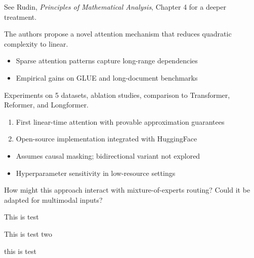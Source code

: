 \documentclass{report}
\begin{document}
\begin{optionalExplore}
	See Rudin, \textit{Principles of Mathematical Analysis}, Chapter 4 for a deeper treatment.
\end{optionalExplore}

\begin{coreIdea}
	The authors propose a novel attention mechanism that reduces quadratic complexity to linear.
\end{coreIdea}

\begin{keyArgs}
	\begin{itemize}
		\item Sparse attention patterns capture long-range dependencies
		\item Empirical gains on GLUE and long-document benchmarks
	\end{itemize}
\end{keyArgs}

\begin{methodology}
	Experiments on 5 datasets, ablation studies, comparison to Transformer, Reformer, and Longformer.
\end{methodology}

\begin{contributions}
	\begin{enumerate}
		\item First linear-time attention with provable approximation guarantees
		\item Open-source implementation integrated with HuggingFace
	\end{enumerate}
\end{contributions}

\begin{limitations}
	\begin{itemize}
		\item Assumes causal masking; bidirectional variant not explored
		\item Hyperparameter sensitivity in low-resource settings
	\end{itemize}
\end{limitations}

\begin{discussion}
	How might this approach interact with mixture-of-experts routing? Could it be adapted for multimodal inputs?
\end{discussion}

\begin{discussion}
        This is test
\end{discussion}
\begin{discussion}
        This is test two
\end{discussion}
\begin{discussion}
        this is test
\end{discussion}
\end{document}
